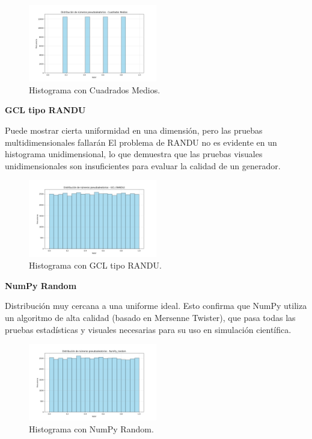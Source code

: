 \documentclass{article}
\begin{document}
\begin{figure}[H]
\centering
\includegraphics[width=0.5\textwidth]{Imagenes/distribucion_Cuadrados Medios.png}
\caption{Histograma con Cuadrados Medios.}
\end{figure}

\textbf{GCL tipo RANDU}

Puede mostrar cierta uniformidad en una dimensión, pero las pruebas multidimensionales fallarán
El problema de RANDU no es evidente en un histograma unidimensional, lo que demuestra que las pruebas visuales unidimensionales son insuficientes para evaluar la calidad de un generador.

\begin{figure}[H]
\centering
\includegraphics[width=0.5\textwidth]{Imagenes/distribucion_GCL (RANDU).png}
\caption{Histograma con GCL tipo RANDU.}
\end{figure}

\textbf{NumPy Random}

Distribución muy cercana a una uniforme ideal. Esto confirma que NumPy utiliza un algoritmo de alta calidad (basado en Mersenne Twister), que pasa todas las pruebas estadísticas y visuales necesarias para su uso en simulación científica.

\begin{figure}[H]
\centering
\includegraphics[width=0.5\textwidth]{Imagenes/distribucion_NumPy_random.png}
\caption{Histograma con NumPy Random.}
\end{figure}
\end{document}
